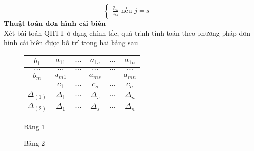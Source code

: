 \documentclass{article}
\begin{document}
\begin{enumerate}
\begin{equation}
\begin{cases}
                                    \frac{q_{rk}}{z_{rs}} \text{ nếu } j = s
                                \end{cases}
                            \end{equation}     
                        \textbf{Thuật toán đơn hình cải biên} \\
                        Xét bài toán QHTT ở dạng chính tắc, quá trình tính toán theo phương pháp đơn hình cải biên được bố trí trong hai bảng sau \\
                            \begin{figure}
                                \caption{Bảng 1}
                                    \begin{center}
                                        \begin{tabular}{|c|c|c|c|c|c|}
                                            \hline
                                            $b_1$ & $a_{11}$ & $\ldots$ & $a_{1s}$ & $\ldots$ & $a_{1n}$ \\
                                            \hline
                                            $\ldots$ & $\ldots$ & $\ldots$ & $\ldots$ & $\ldots$ & $\ldots$ \\
                                            \hline
                                            $b_m$ & $a_{m1}$ & $\ldots$ & $a_{ms}$ & $\ldots$ & $a_{mn}$ \\
                                            \hline
                                            & $c_1$ & $\ldots$ & $c_s$ & $\ldots$ & $c_n$ \\
                                            \hline
                                            $\Delta_{(1)}$ & $\Delta_1$ & $\ldots$ & $\Delta_s$ & $\ldots$ & $\Delta_n$ \\
                                            \hline
                                            $\Delta_{(2)}$ & $\Delta_1$ & $\ldots$ & $\Delta_s$ & $\ldots$ & $\Delta_n$ \\
                                            \hline    
                                        \end{tabular}
                                    \end{center}  
                            \end{figure} 
                            \begin{figure}
                                \caption{Bảng 2}
                                    \begin{center}

\end{center}
\end{figure}
\end{enumerate}
\end{document}

